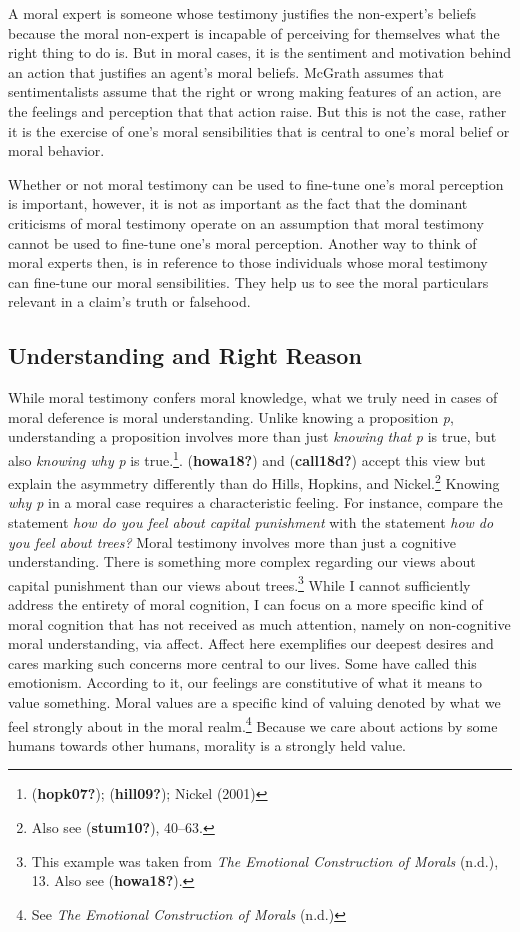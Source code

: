 \documentclass[12pt]{book}
\theoremstyle{definition}
\theoremstyle{remark}
\begin{document}
A moral expert is someone whose testimony justifies the non-expert's beliefs because the moral non-expert is incapable of perceiving for themselves what the right thing to do is. But in moral cases, it is the sentiment and motivation behind an action that justifies an agent's moral beliefs. McGrath assumes that sentimentalists assume that the right or wrong making features of an action, are the feelings and perception that that action raise. But this is not the case, rather it is the exercise of one's moral sensibilities that is central to one's moral belief or moral behavior.

Whether or not moral testimony can be used to fine-tune one's moral perception is important, however, it is not as important as the fact that the dominant criticisms of moral testimony operate on an assumption that moral testimony cannot be used to fine-tune one's moral perception. Another way to think of moral experts then, is in reference to those individuals whose moral testimony can fine-tune our moral sensibilities. They help us to see the moral particulars relevant in a claim's truth or falsehood.

\subsection*{Understanding and Right Reason}\label{understanding-and-right-reason}

While moral testimony confers moral knowledge, what we truly need in cases of moral deference is moral understanding. Unlike knowing a proposition \emph{p}, understanding a proposition involves more than just \emph{knowing that} \emph{p} is true, but also \emph{knowing why} \emph{p} is true.\footnote{(\textbf{hopk07?}); (\textbf{hill09?}); Nickel (2001)}. (\textbf{howa18?}) and (\textbf{call18d?}) accept this view but explain the asymmetry differently than do Hills, Hopkins, and Nickel.\footnote{Also see (\textbf{stum10?}), 40--63.} Knowing \emph{why p} in a moral case requires a characteristic feeling. For instance, compare the statement \emph{how do you feel about capital punishment} with the statement \emph{how do you feel about trees?} Moral testimony involves more than just a cognitive understanding. There is something more complex regarding our views about capital punishment than our views about trees.\footnote{This example was taken from \emph{The {Emotional Construction} of {Morals}} (n.d.), 13. Also see (\textbf{howa18?}).} While I cannot sufficiently address the entirety of moral cognition, I can focus on a more specific kind of moral cognition that has not received as much attention, namely on non-cognitive moral understanding, via affect. Affect here exemplifies our deepest desires and cares marking such concerns more central to our lives. Some have called this emotionism. According to it, our feelings are constitutive of what it means to value something. Moral values are a specific kind of valuing denoted by what we feel strongly about in the moral realm.\footnote{See \emph{The {Emotional Construction} of {Morals}} (n.d.)} Because we care about actions by some humans towards other humans, morality is a strongly held value.
\end{document}
